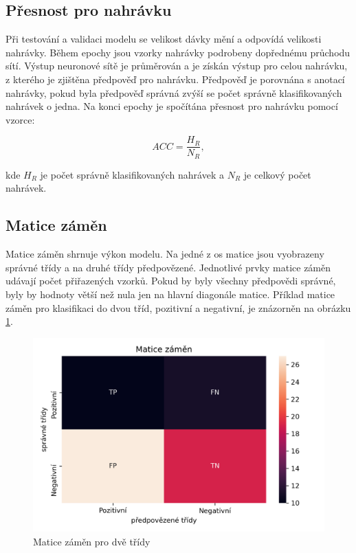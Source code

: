 \documentclass[FM,BP]{tulthesis}
\begin{document}
\subsection{Přesnost pro nahrávku}
Při testování a validaci modelu se velikost dávky mění a odpovídá velikosti nahrávky. Během epochy jsou vzorky nahrávky podrobeny dopřednému průchodu sítí. Výstup neuronové sítě je průměrován a je získán výstup pro celou nahrávku, z kterého je zjištěna předpověď pro nahrávku. Předpověď je porovnána s anotací nahrávky, pokud byla předpověď správná zvýší se počet správně klasifikovaných nahrávek o jedna. Na konci epochy je spočítána přesnost pro nahrávku pomocí vzorce:

\begin{equation}
\label{eqn:accuracy}
ACC = \frac{H_R}{N_R},
\end{equation}

kde $ H_R $ je počet správně klasifikovaných nahrávek a $ N_R $ je celkový počet nahrávek.

\subsection{Matice záměn} %
Matice záměn shrnuje výkon modelu. Na jedné z os matice jsou vyobrazeny správné třídy a na druhé třídy předpovězené. Jednotlivé prvky matice záměn udávají počet přiřazených vzorků. Pokud by byly všechny předpovědi správné, byly by hodnoty větší než nula jen na hlavní diagonále matice. Příklad matice záměn pro klasifikaci do dvou tříd, pozitivní a negativní, je znázorněn na obrázku \mbox{\ref{fig:conf_matrix-example}}.

\begin{figure}[ht]
\centerline{\includegraphics[scale=.7]{conf_matrix-example.png}}
\caption{Matice záměn pro dvě třídy}
\label{fig:conf_matrix-example}
\end{figure}
\FloatBarrier
\end{document}
